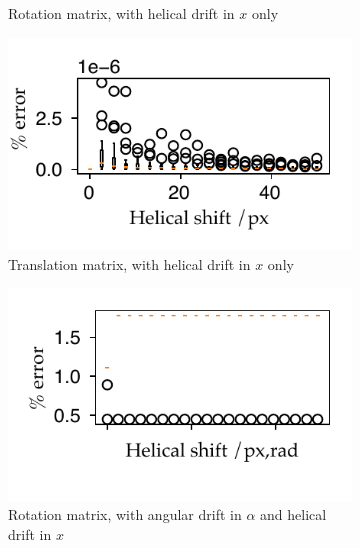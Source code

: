 \begin{figure}
\begin{subfigure}[t]{0.5\textwidth}
          \caption{Rotation matrix, with helical drift in $x$ only}\label{fig:pc_sum_rot_tx}
        \end{subfigure}\hfill
        \begin{subfigure}[t]{0.5\textwidth}
          \captionsetup{width=0.8\textwidth}
          \centering
          \includegraphics{Chapters/flopt/Figs/PDF/results/helix/decompose/pc_sum_trans_tx}
          \caption{Translation matrix, with helical drift in $x$ only} \label{fig:pc_sum_trans_tx}
        \end{subfigure}
    \bigskip
        \begin{subfigure}[t]{0.5\textwidth}
          \captionsetup{width=0.8\textwidth}
          \centering
          \includegraphics{Chapters/flopt/Figs/PDF/results/helix/decompose/pc_sum_rot_both}
          \caption{Rotation matrix, with angular drift in $\alpha$ and helical drift in $x$}\label{fig:pc_sum_rot_both}
        \end{subfigure}\hfill
        \begin{subfigure}[t]{0.5\textwidth}
          \captionsetup{width=0.8\textwidth}
          \centering

\end{subfigure}
\end{figure}
